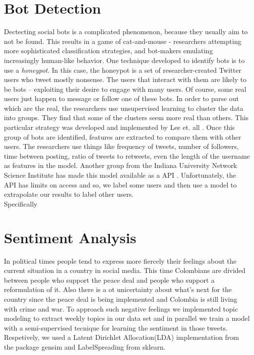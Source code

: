 \documentclass[10pt,a4paper]{article} %
\begin{document}
	\section{Bot Detection} 
		Dectecting social bots is a complicated phenomenon, because they usually aim to not be found.  This results in a game of cat-and-mouse - researchers attempting more sophisticated classification strategies, and bot-makers emulating increasingly human-like behavior.  One technique developed to identify bots is to use a \textit{honeypot}.  In this case, the honeypot is a set of researcher-created Twitter users who tweet mostly nonsense.  The users that interact with them are likely to be bots -- exploiting their desire to engage with many users.  Of course, some real users just happen to message or follow one of these bots.  In order to parse out which are the real, the researchers use unsupervised learning to cluster the data into groups.  They find that some of the clusters seem more real than others.  This particular strategy was developed and implemented by Lee et. all \cite{}.  Once this group of bots are identified, features are extracted to compare them with other users.  The researchers use things like frequency of tweets, number of followers, time between posting, ratio of tweets to retweets, even the length of the username as features in the model.  Another group from the Indiana University Network Science Institute has made this model available as a API \cite{DavisVFFM16}.  Unfortunately, the API has limits on access and so, we label some users and then use a model to extrapolate our results to label other users. \\
		
		\noindent Specifically
	\section{Sentiment Analysis}
	In political times people tend to express more fiercely their feelings about the current situation in a country in social media. This time Colombians are divided between people who support the peace deal and people who support a reformulation of it. Also there is a ot unicertainty about what's next for the country since the peace deal is being implemented and Colombia is still living with crime and war. To approach such negative feelings we implemented topic modeling to extract weekly topics in our data set and in parallel we train a model with a semi-supervised tecnique for learning the sentiment in those tweets. Respetively, we used a Latent Dirichlet Allocation(LDA) implementation from the package gensim and LabelSpreading from sklearn.
	
\end{document}
